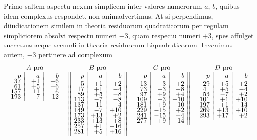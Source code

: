 \documentclass[twoside,12pt]{memoir}
\begin{document}
Primo saltem aspectu nexum simplicem inter valores numerorum \(a\), \(b\), quibus idem complexus respondet, non animadvertimus. At si perpendimus, diiudicationem similem in theoria residuorum quadraticorum per regulam simpliciorem absolvi respectu numeri \(-3\), quam respectu numeri \(+3\), spes affulget successus aeque secundi in theoria residuorum biquadraticorum. Invenimus autem, \(-3\) pertinere ad complexum
\[\begin{array}{cccc}
\begin{array}[t]{r|r|r} 
\multicolumn{3}{c}{ A \text{ pro} }\\
p & a & b \\[-4pt]
37&+1&-6\\[-4pt]
61&+5&-6\\[-4pt]
157&-11&-6\\[-4pt]
193 & -7 & -12 
\end{array} & 
\begin{array}[t]{||r|r|r||} 
\multicolumn{3}{c}{ B \text{ pro} }\\
p & a & b \\
5&+1&+2\\[-4pt]
17&+1&-4\\[-4pt]
89&+5&-8\\[-4pt]
113&-7&-8\\[-4pt]
137&-11&-4\\[-4pt]
149&-7&+10\\[-4pt]
173&+13&+2\\[-4pt]
233&+13&+8\\[-4pt]
257&+1&-16\\[-4pt]
281&+5&+16
\end{array}&
\begin{array}[t]{r|r|r||} 
\multicolumn{3}{c}{ C \text{ pro} }\\
p & a & b \\
13 & -3 & +2 \\[-4pt]
73&-3&-8\\[-4pt]
97&+9&+4\\[-4pt]
109 & -3 & +10 \\[-4pt]
181 & +9 & +10 \\[-4pt]
229 & -15 & +2 \\[-4pt]
241&-15&-4 \\[-4pt]
 277 & +9 & +14 
\end{array}
&
 \begin{array}[t]{r|r|r} 
  \multicolumn{3}{c}{ D \text{ pro} }\\
 p & a & b \\
29&+5&+2\\[-4pt]
41&+5&-4\\[-4pt]
53&-7&+2\\[-4pt]
101&+1&+10\\[-4pt]
197&+1&-14\\[-4pt]
269&+13&+10\\[-4pt]
293&+17&+2 
\end{array}
\end{array}\]
\end{document}
